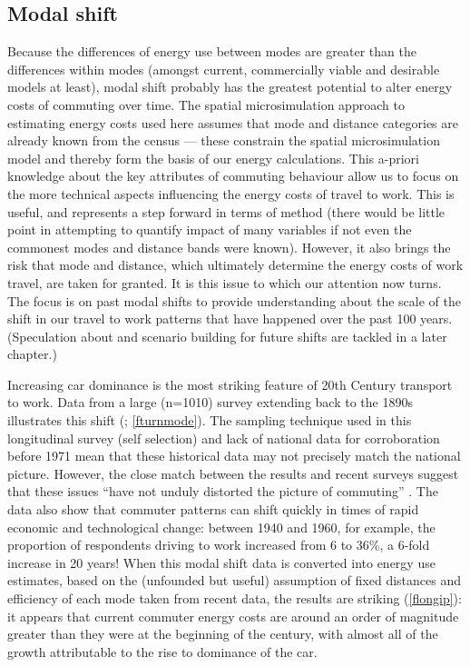 \subsection{Modal shift}
Because the differences of energy use between modes are greater than the
differences within modes (amongst current, commercially viable and desirable
models at least),
modal shift probably has the greatest potential to alter energy costs of commuting
over time. The spatial microsimulation approach to estimating energy costs used
here assumes that mode and distance categories are already known from the
census --- these constrain the spatial microsimulation model and thereby form
the basis of our energy calculations. This a-priori knowledge about the key attributes
of commuting behaviour allow us to focus on the more technical aspects influencing
the energy costs of travel to work. This is useful, and represents a step forward
in terms of method (there would be little point in attempting to quantify
impact of many variables if not even the commonest modes and distance bands
were known). However, it also brings the risk that mode and distance, which ultimately
determine the energy costs of work travel, are taken for granted.
It is this issue to which our attention now turns. The focus is on past modal
shifts  to provide understanding about the scale of the
shift in our travel to work patterns that have happened over the past 100 years.
(Speculation about and scenario building for future shifts are tackled
in a later chapter.)

Increasing car dominance is the most striking feature of 20th Century transport
to work. Data from a large (n=1010) survey extending back to the 1890s
illustrates this shift (\citealp{Turnbull2000}; \cref{fturnmode}).
The sampling technique used in
this longitudinal survey (self selection) and lack of national data for
corroboration before 1971 mean that these historical data may not precisely
match the national picture. However, the close match between the results and
recent surveys suggest that these issues ``have not unduly distorted the picture
of commuting'' \citep[p.~13]{Turnbull2000}⁠.  The data also show that commuter patterns can
shift quickly in times of rapid economic and technological change: between 1940
and 1960, for example, the proportion of respondents  driving to work increased
from 6 to 36\%, a 6-fold increase in 20 years! When this modal shift data is
converted into energy use estimates, based on the (unfounded but useful)
assumption of fixed distances and efficiency of each mode taken from recent
data, the results are striking (\cref{flongip}): it appears that current
commuter energy costs are around an order of magnitude greater than they were
at the beginning of the century, with almost all of the growth attributable to
the rise to dominance of the car.

